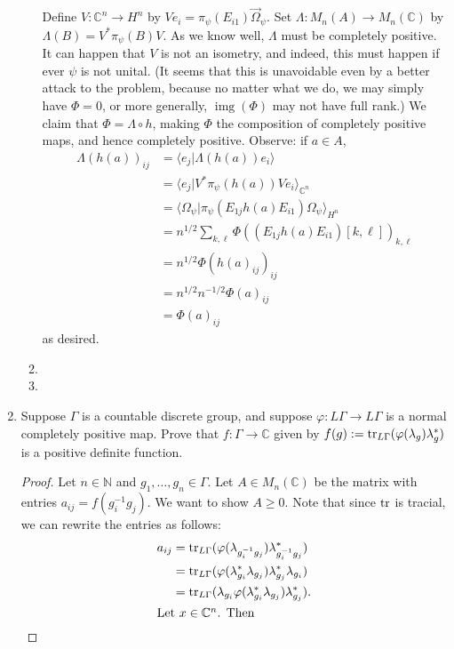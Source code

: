 \documentclass[a4paper,10pt]{report}
\newcommand{\ggen}[1]{\langle#1\rangle}
\newcommand{\N}{\mathbb{N}}
\newcommand{\C}{\mathbb{C}}
\DeclareMathOperator{\img}{img}
\begin{document}
\begin{enumerate}
\begin{enumerate}
				Define $V:\C^n\to H^n$ by $Ve_i=\pi_\psi(E_{i1})\vec{\Omega}_\psi$. Set $\Lambda:M_n(A)\to M_n(\C)$ by $\Lambda(B)=V^*\pi_\psi(B)V$. As we know well, $\Lambda$ must be completely positive. It can happen that $V$ is not an isometry, and indeed, this must happen if ever $\psi$ is not unital. 
				(It seems that this is unavoidable even by a better attack to the problem, because no matter what we do, we may simply have $\Phi=0$, or more generally, $\img(\Phi)$ may not have full rank.) 
				We claim that $\Phi=\Lambda\circ h$, making $\Phi$ the composition of completely positive maps, and hence completely positive. Observe: if $a\in A$, 
				\begin{align*}
					\Lambda(h(a))_{ij} &= \ggen{e_j|\Lambda(h(a))e_i}\\
					&= \ggen{e_j|V^*\pi_\psi(h(a))Ve_i}_{\C^n}\\
					&= \ggen{\Omega_\psi|\pi_\psi(E_{1j}h(a)E_{i1})\Omega_\psi}_{H^n}\\
					&= n^{1/2}\sum_{k,\ell}\Phi((E_{1j}h(a)E_{i1})[k,\ell])_{k,\ell}\\
					&= n^{1/2}\Phi(h(a)_{ij})_{ij}\\
					&= n^{1/2}n^{-1/2}\Phi(a)_{ij}\\
					&= \Phi(a)_{ij}
				\end{align*}
				as desired. 
			\item 
			\item 
		\end{enumerate}
	\item	Suppose $\Gamma$ is a countable discrete group,
		and suppose $\varphi : L\Gamma \to L\Gamma$ is a normal completely positive map.
		Prove that $f : \Gamma \to \C$ given by $f(g) := \operatorname{tr}_{L\Gamma}(\varphi(\lambda_g)\lambda_g^*)$
		is a positive definite function.
		\begin{proof}
			Let $n \in \N$ and $g_1, \dots, g_n \in \Gamma$.
			Let $A \in M_n(\C)$ be the matrix with entries $a_{ij} = f(g_i^{-1}g_j)$.
			We want to show $A \ge 0$.
			Note that since $\operatorname{tr}$ is tracial, we can rewrite the entries as follows:
			\begin{align*}
				a_{ij} & = \tr_{L\Gamma}(\varphi(\lambda_{g_i^{-1}g_j})\lambda_{g_i^{-1}g_j}^*) \\
				 & = \tr_{L\Gamma}(\varphi(\lambda_{g_i}^* \lambda_{g_j})
				 \lambda_{g_j}^*\lambda_{g_i}) \\
				 & = \tr_{L\Gamma}(\lambda_{g_i}\varphi(\lambda_{g_i}^* \lambda_{g_j})
				 \lambda_{g_j}^*). \\
			\intertext{Let $x \in \C^n$. Then}

\end{align*}
\end{proof}
\end{enumerate}
\end{document}
